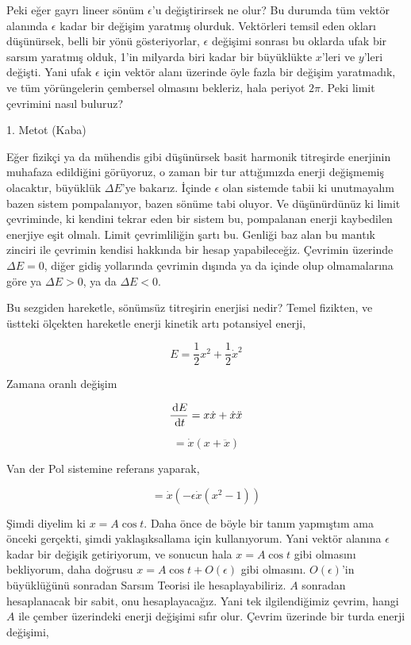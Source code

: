 \documentclass[12pt,fleqn]{article}\usepackage{../../common}
\begin{document}
Peki eğer gayrı lineer sönüm $\epsilon$'u değiştirirsek ne olur? Bu durumda tüm
vektör alanında $\epsilon$ kadar bir değişim yaratmış olurduk. Vektörleri temsil
eden okları düşünürsek, belli bir yönü gösteriyorlar, $\epsilon$ değişimi
sonrası bu oklarda ufak bir sarsım yaratmış olduk, 1'in milyarda biri kadar bir
büyüklükte $x$'leri ve $y$'leri değişti. Yani ufak $\epsilon$ için vektör alanı
üzerinde öyle fazla bir değişim yaratmadık, ve tüm yörüngelerin çembersel
olmasını bekleriz, hala periyot $2\pi$. Peki limit çevrimini nasıl buluruz?

1. Metot (Kaba)

Eğer fizikçi ya da mühendis gibi düşünürsek basit harmonik titreşirde enerjinin
muhafaza edildiğini görüyoruz, o zaman bir tur attığımızda enerji değişmemiş
olacaktır, büyüklük $\Delta E$'ye bakarız. İçinde $\epsilon$ olan sistemde tabii
ki unutmayalım bazen sistem pompalanıyor, bazen sönüme tabi oluyor. Ve
düşünürdünüz ki limit çevriminde, ki kendini tekrar eden bir sistem bu,
pompalanan enerji kaybedilen enerjiye eşit olmalı. Limit çevrimliliğin şartı
bu. Genliği baz alan bu mantık zinciri ile çevrimin kendisi hakkında bir hesap
yapabileceğiz. Çevrimin üzerinde $\Delta E = 0$, diğer gidiş yollarında çevrimin
dışında ya da içinde olup olmamalarına göre ya $\Delta E > 0$, ya da $\Delta
E<0$.

Bu sezgiden hareketle, sönümsüz titreşirin enerjisi nedir? Temel fizikten, ve
üstteki ölçekten hareketle enerji kinetik artı potansiyel enerji,

$$ E = \frac{1}{2}x^2 + \frac{1}{2}\dot{x}^2 $$

Zamana oranlı değişim

$$ \frac{\,\mathrm{d} E}{\,\mathrm{d} t} = x\dot{x} + \dot{x}\ddot{x} $$

$$ = \dot{x}(x + \ddot{x}) $$

Van der Pol sistemine referans yaparak,

$$ = \dot{x} (-\epsilon \dot{x} (x^2-1)) $$

Şimdi diyelim ki $x = A\cos t$. Daha önce de böyle bir tanım yapmıştım ama
önceki gerçekti, şimdi yaklaşıksallama için kullanıyorum. Yani vektör alanına
$\epsilon$ kadar bir değişik getiriyorum, ve sonucun hala $x = A\cos t$ gibi
olmasını bekliyorum, daha doğrusu $x = A\cos t + O(\epsilon)$ gibi
olmasını. $O(\epsilon)$'in büyüklüğünü sonradan Sarsım Teorisi ile
hesaplayabiliriz. $A$ sonradan hesaplanacak bir sabit, onu hesaplayacağız. Yani
tek ilgilendiğimiz çevrim, hangi $A$ ile çember üzerindeki enerji değişimi sıfır
olur. Çevrim üzerinde bir turda enerji değişimi,
\end{document}
